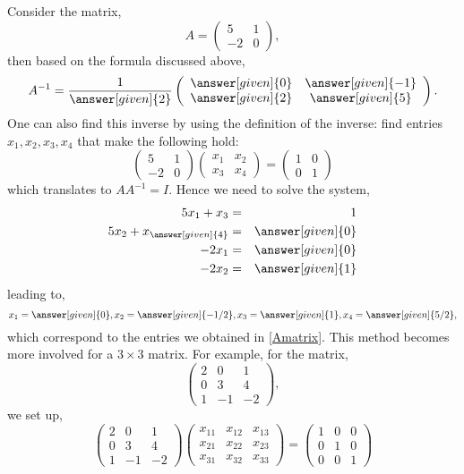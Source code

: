 \documentclass{ximera}
\begin{document}
Consider the matrix,
\[
A= \left(\begin{array}{cc}
  5 &  1 \\
  -2 &  0
\end{array}\right),
\]
then based on the formula discussed above,
\begin{equation}\label{Amatrix}
A^{-1}= \frac{1}{\answer[given]{2}} \left(\begin{array}{cc}
  \answer[given]{0} &  \answer[given]{-1} \\
  \answer[given]{2} &  \answer[given]{5}
\end{array}\right).
\end{equation}
One can also find this inverse by using the definition of the inverse: find entries $x_{1}, x_{2}, x_{3}, x_{4}$ that make the following hold:
\[
\left(\begin{array}{cc}
  5 &  1 \\
  -2 &  0
\end{array}\right) \left(\begin{array}{cc}
  x_{1} &  x_{2} \\
  x_{3} &  x_{4}
\end{array}\right)= \left(\begin{array}{cc}
  1 &  0 \\
  0 &  1
\end{array}\right)  
\]
which translates to $AA^{-1}=I$. Hence we need to solve the system,
\begin{eqnarray*}
5x_{1}+x_{3}&=&1\\
5x_{2} + x_{\answer[given]{4}} &=& \answer[given]{0}\\
-2x_{1}&=& \answer[given]{0}\\
-2x_{2} &=& \answer[given]{1}
\end{eqnarray*}
leading to,
\begin{equation*}
x_{1} = \answer[given]{0}, x_{2} =\answer[given]{-1/2}, x_{3} = \answer[given]{1}, x_{4} = \answer[given]{5/2},
\end{equation*}
which correspond to the entries we obtained in \eqref{Amatrix}. This method becomes more involved for a $3\times 3$ matrix. For example, for the matrix,
\[
\left(\begin{array}{ccc}
  2 &  0 & 1 \\
  0 &  3 & 4 \\
  1 & -1 & -2
\end{array}\right),
\]
 we set up, 
 \[
\left(\begin{array}{ccc}
  2 &  0 & 1 \\
  0 &  3 & 4 \\
  1 & -1 & -2
\end{array}\right) \left(\begin{array}{ccc}
  x_{11} &  x_{12} & x_{13} \\
 x_{21} &  x_{22} & x_{23} \\
  x_{31} &  x_{32} & x_{33}
\end{array}\right)
= \left(\begin{array}{ccc}
  1 &  0 & 0 \\
  0 &  1 & 0 \\
  0 & 0 & 1
\end{array}\right)
\]
\end{document}

